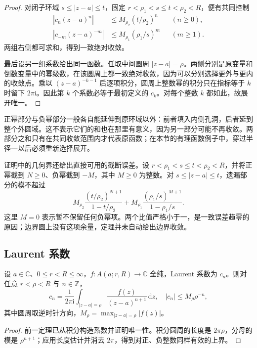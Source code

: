 \begin{proof}
对闭子环域 \(s\le|z-a|\le t\)，固定 \(r<\rho_1<s\le t<\rho_2<R\)，便有共同控制
\[
 \begin{aligned}
 |c_n(z-a)^n|&\le M_{\rho_2}(t/\rho_2)^n&& (n\ge0),\\
 |c_{-m}(z-a)^{-m}|&\le M_{\rho_1}(\rho_1/s)^m&& (m\ge1).
 \end{aligned}
\]
两组右侧都可求和，得到一致绝对收敛。

最后设另一组系数给出同一函数。任取中间圆周 \(|z-a|=\rho\)。两侧分别是原变量和倒数变量中的幂级数，在该圆周上都一致绝对收敛，因为可以分别选择更外与更内的收敛点。乘以 \((z-a)^{-k-1}\) 后逐项积分，圆周上整数幂的积分只在指标等于 \(k\) 时留下 \(2\pi\mathrm{i}\)。因此第 \(k\) 个系数必等于最初定义的 \(c_k\)。对每个整数 \(k\) 都如此，故展开唯一。
\end{proof}

正幂部分与负幂部分一般各自能延伸到原环域以外：前者填入内侧孔洞，后者延到整个外圆域。这不表示它们的和也在那里有意义，因为另一部分可能不再收敛。两部分之和只有在共同收敛范围内才代表原函数；在本节的有理函数例子中，穿过半径一以后必须重新选择展开。

\ProseParagraphBreak

证明中的几何界还给出直接可用的截断误差。设 \(r<\rho_1<s\le t<\rho_2<R\)，并将正幂截到 \(N\ge0\)、负幂截到 \(-M\)，其中 \(M\ge0\) 为整数。对 \(s\le|z-a|\le t\)，遗漏部分的模不超过
\[
 M_{\rho_2}\frac{(t/\rho_2)^{N+1}}{1-t/\rho_2}
 +M_{\rho_1}\frac{(\rho_1/s)^{M+1}}{1-\rho_1/s}.
\]
这里 \(M=0\) 表示暂不保留任何负幂项。两个比值严格小于一，是一致误差趋零的原因；边界圆上没有这项余量，定理并未自动给出边界收敛。

\subsection{Laurent 系数}
\label{b3:subsec:030103}

\begin{proposition}\label{b3:prop:03-laurent-coefficients}
设 \(a\in\mathbb C\)、\(0\le r<R\le\infty\)，\(f:A(a;r,R)\to\mathbb C\) 全纯，Laurent 系数为 \(c_n\)。则对任意 \(r<\rho<R\) 与 \(n\in\mathbb Z\)，
\[
 c_n=\frac1{2\pi\mathrm{i}}\int_{|z-a|=\rho}
     \frac{f(z)}{(z-a)^{n+1}}\,\mathrm{d}z,
 \quad |c_n|\le M_\rho\rho^{-n},
\]
其中圆周取逆时针方向，\(M_\rho=\max_{|z-a|=\rho}|f(z)|\)。
\end{proposition}
\begin{proof}
前一定理已从积分构造系数并证明唯一性。积分圆周的长度是 \(2\pi\rho\)，分母的模是 \(\rho^{n+1}\)；应用长度估计并消去 \(2\pi\)，得到对正、负整数同样有效的上界。
\end{proof}

